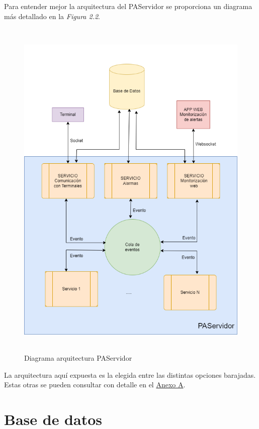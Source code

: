 Para entender mejor la arquitectura del PAServidor se proporciona un diagrama más detallado en la \textit{Figura 2.2}.

\begin{figure}[H]
    \centering
    \includegraphics[width=1\textwidth,height=17cm]{Imagenes/Arquitectura-PAServidor}
    \caption{Diagrama arquitectura PAServidor}
    \label{fig:PAServidor}
\end{figure}


La arquitectura aquí expuesta es la elegida entre las distintas opciones barajadas. Estas otras se pueden consultar con detalle en el \hyperref[anexo-a]{Anexo A}.


\section{Base de datos}


